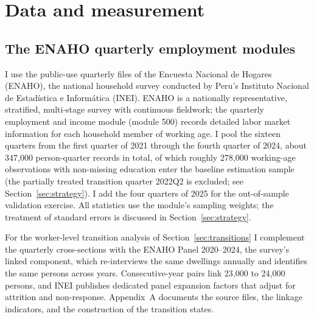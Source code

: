 \section{Data and measurement}\label{sec:data}

\subsection{The ENAHO quarterly employment modules}

I use the public-use quarterly files of the Encuesta Nacional de Hogares (ENAHO), the national household survey conducted by Peru's Instituto Nacional de Estadística e Informática (INEI). ENAHO is a nationally representative, stratified, multi-stage survey with continuous fieldwork; the quarterly employment and income module (module 500) records detailed labor market information for each household member of working age. I pool the sixteen quarters from the first quarter of 2021 through the fourth quarter of 2024, about 347,000 person-quarter records in total, of which roughly 278,000 working-age observations with non-missing education enter the baseline estimation sample (the partially treated transition quarter 2022Q2 is excluded; see Section~\ref{sec:strategy}). I add the four quarters of 2025 for the out-of-sample validation exercise. All statistics use the module's sampling weights; the treatment of standard errors is discussed in Section~\ref{sec:strategy}.

For the worker-level transition analysis of Section~\ref{sec:transitions} I complement the quarterly cross-sections with the ENAHO Panel 2020--2024, the survey's linked component, which re-interviews the same dwellings annually and identifies the same persons across years. Consecutive-year pairs link 23,000 to 24,000 persons, and INEI publishes dedicated panel expansion factors that adjust for attrition and non-response. Appendix~A documents the source files, the linkage indicators, and the construction of the transition states.

